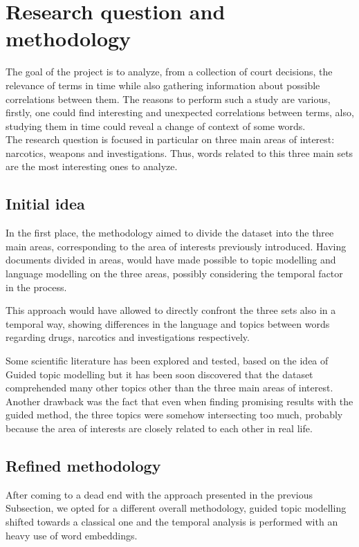 \section{Research question and methodology}

The goal of the project is to analyze, from a collection 
of court decisions, the relevance of terms in time while 
also gathering information about possible correlations between 
them. The reasons to perform such a study are various, firstly, 
one could find interesting and unexpected correlations between terms, 
also, studying them in time could reveal a change of 
context of some words.\\
The research question is focused in particular on three main areas of interest:
narcotics, weapons and investigations. Thus, words related to this three main sets
are the most interesting ones to analyze.

\subsection{Initial idea}
\label{res-med}
In the first place, the methodology aimed to divide the dataset into the three main areas, 
corresponding to the area of interests previously introduced. 
Having documents divided in areas, would have made possible to topic modelling and language modelling on the three areas, possibly considering the temporal factor in the process. 

This approach would have allowed to directly confront the three sets also in a temporal way, showing differences in the language and topics between words regarding drugs, narcotics and investigations respectively.

Some scientific literature has been explored and tested, based on the idea of Guided topic modelling 
but it has been soon discovered that the dataset comprehended many other topics other than the
three main areas of interest. Another drawback was the fact that even when finding promising results 
with the guided method, the three topics were somehow intersecting too much, probably because the 
area of interests are closely related to each other in real life.

\subsection{Refined methodology}

After coming to a dead end with the approach presented in the previous Subsection, we opted for a different
overall methodology, guided topic modelling shifted towards a classical one and the temporal 
analysis is performed with an heavy use of word embeddings.  